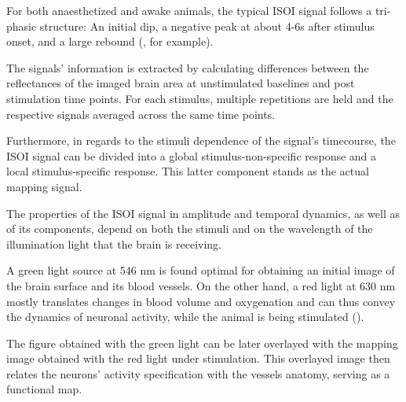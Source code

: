 For both anaesthetized and awake animals, the typical ISOI signal follows a tri-phasic structure: An initial dip, a negative peak at about 4-6s after stimulus onset, and a large rebound (\cite{Lu2017}, for example).

The signals' information is extracted by calculating differences between the reflectances of the imaged brain area at unstimulated baselines and post stimulation time points. For each stimulus, multiple repetitions are held and the respective signals averaged across the same time points.

Furthermore, in regards to the stimuli dependence of the signal's timecourse, the ISOI signal can be divided into a global stimulus-non-specific response and a local stimulus-specific response. This latter component stands as the actual mapping signal. 

The properties of the ISOI signal in amplitude and temporal dynamics, as well as of its components, depend on both the stimuli and on the wavelength of the illumination light that the brain is receiving.

A green light source at 546 nm is found optimal for obtaining an initial image of the brain surface and its blood vessels. On the other hand, a red light at 630 nm mostly translates changes in blood volume and oxygenation and can thus convey the dynamics of neuronal activity, while the animal is being stimulated (\cite{Zepeda2004}). 

The figure obtained with the green light can be later overlayed with the mapping image obtained with the red light under stimulation. This overlayed image then relates the neurons' activity specification with the vessels anatomy, serving as a functional map.

